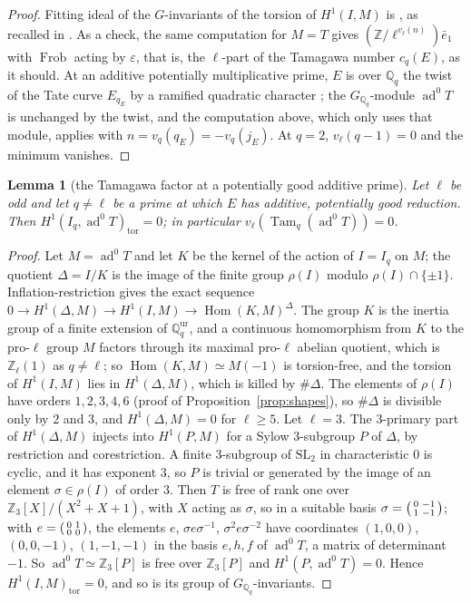\documentclass[11pt]{amsart}
\newtheorem{lemma}[theorem]{Lemma}
\theoremstyle{definition}
\newcommand{\Q}{\mathbb{Q}}
\newcommand{\Z}{\mathbb{Z}}
\newcommand{\ad}{\operatorname{ad}^0}
\newcommand{\Frob}{\operatorname{Frob}}
\newcommand{\Tam}{\operatorname{Tam}}
\newcommand{\SL}{\mathrm{SL}}
\begin{document}
\begin{proof}
Fitting ideal of the $G$-invariants of the torsion of $H^1(I,M)$ is \cite[I.4.2.2]{FPR94}, as recalled in \cite[p.~708]{DFG04}. As a check, the same computation for $M=T$ gives $(\Z/\ell^{v_\ell(n)})\bar e_1$ with $\Frob$ acting by $\varepsilon$, that is, the $\ell$-part of the Tamagawa number $c_q(E)$, as it should. At an additive potentially multiplicative prime, $E$ is over $\Q_q$ the twist of the Tate curve $E_{q_E}$ by a ramified quadratic character \cite[V.5]{SilvermanATAEC}; the $G_{\Q_q}$-module $\ad T$ is unchanged by the twist, and the computation above, which only uses that module, applies with $n=v_q(q_E)=-v_q(j_E)$. At $q=2$, $v_\ell(q-1)=0$ and the minimum vanishes.
\end{proof}

\begin{lemma}[the Tamagawa factor at a potentially good additive prime]\label{lem:tamadd}
Let $\ell$ be odd and let $q\ne\ell$ be a prime at which $E$ has additive, potentially good reduction. Then $H^1(I_q,\ad T)_{\mathrm{tor}}=0$; in particular $v_\ell(\Tam_q(\ad T))=0$.
\end{lemma}

\begin{proof}
Let $M=\ad T$ and let $K$ be the kernel of the action of $I=I_q$ on $M$; the quotient $\Delta=I/K$ is the image of the finite group $\rho(I)$ modulo $\rho(I)\cap\{\pm1\}$. Inflation-restriction gives the exact sequence $0\to H^1(\Delta,M)\to H^1(I,M)\to\operatorname{Hom}(K,M)^\Delta$. The group $K$ is the inertia group of a finite extension of $\Q_q^{\mathrm{ur}}$, and a continuous homomorphism from $K$ to the pro-$\ell$ group $M$ factors through its maximal pro-$\ell$ abelian quotient, which is $\Z_\ell(1)$ as $q\ne\ell$; so $\operatorname{Hom}(K,M)\simeq M(-1)$ is torsion-free, and the torsion of $H^1(I,M)$ lies in $H^1(\Delta,M)$, which is killed by $\#\Delta$. The elements of $\rho(I)$ have orders $1,2,3,4,6$ (proof of Proposition~\ref{prop:shapes}), so $\#\Delta$ is divisible only by $2$ and $3$, and $H^1(\Delta,M)=0$ for $\ell\ge5$. Let $\ell=3$. The $3$-primary part of $H^1(\Delta,M)$ injects into $H^1(P,M)$ for a Sylow $3$-subgroup $P$ of $\Delta$, by restriction and corestriction. A finite $3$-subgroup of $\SL_2$ in characteristic $0$ is cyclic, and it has exponent $3$, so $P$ is trivial or generated by the image of an element $\sigma\in\rho(I)$ of order $3$. Then $T$ is free of rank one over $\Z_3[X]/(X^2+X+1)$, with $X$ acting as $\sigma$, so in a suitable basis $\sigma=\begin{psmallmatrix}0&-1\\1&-1\end{psmallmatrix}$; with $e=\begin{psmallmatrix}0&1\\0&0\end{psmallmatrix}$, the elements $e$, $\sigma e\sigma^{-1}$, $\sigma^2e\sigma^{-2}$ have coordinates $(1,0,0)$, $(0,0,-1)$, $(1,-1,-1)$ in the basis $e,h,f$ of $\ad T$, a matrix of determinant $-1$. So $\ad T\simeq\Z_3[P]$ is free over $\Z_3[P]$ and $H^1(P,\ad T)=0$. Hence $H^1(I,M)_{\mathrm{tor}}=0$, and so is its group of $G_{\Q_q}$-invariants.
\end{proof}
\end{document}

